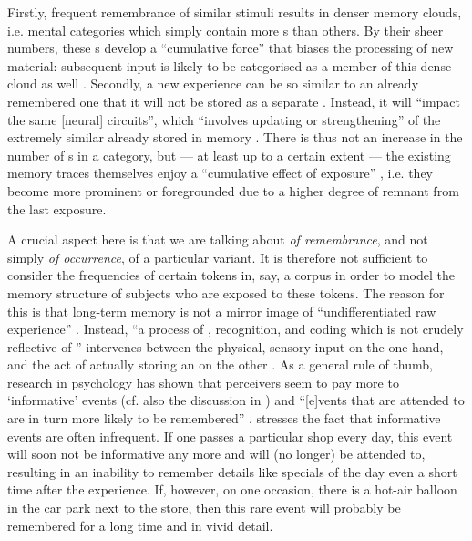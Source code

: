 Firstly, frequent remembrance of similar stimuli results in denser memory clouds, i.e. mental categories which simply contain more s than others.
By their sheer numbers, these s develop a ``cumulative force'' that biases the processing of new material: subsequent input is likely to be categorised as a member of this dense cloud as well \parencite[cf.][524]{pierrehumbert2006}.
Secondly, a new experience can be so similar to an already remembered one that it will not be stored as a separate .
Instead, it will ``impact the same [neural] circuits'', which ``involves updating or strengthening'' of the extremely similar  already stored in memory \parencite[525]{pierrehumbert2006}.
There is thus not an increase in the number of s in a category, but --- at least up to a certain extent --- the existing memory traces themselves enjoy a ``cumulative effect of exposure'' \parencite[525]{pierrehumbert2006}, i.e. they become more prominent or foregrounded due to a higher degree of remnant  from the last exposure.

A crucial aspect here is that we are talking about \emph{ of remembrance}, and not simply \emph{ of occurrence}, of a particular variant.
It is therefore not sufficient to consider the frequencies of certain tokens in, say, a corpus in order to model the memory structure of subjects who are exposed to these tokens.
The reason for this is that long-term memory is not a mirror image of ``undifferentiated raw experience'' \parencite[525]{pierrehumbert2006}.
Instead, ``a process of , recognition, and coding which is not crudely reflective of '' intervenes between the physical, sensory input on the one hand, and the act of actually storing an  on the other \parencite[525]{pierrehumbert2006}.
As a general rule of thumb, research in psychology has shown that perceivers seem to pay more  to `informative' events (cf. also the discussion in \citealt{racz2013}) and ``[e]vents that are attended to are in turn more likely to be remembered'' \parencite[525]{pierrehumbert2006}.
\textcite[cf.][525]{pierrehumbert2006} stresses the fact that informative events are often infrequent.
If one passes a particular shop every day, this event will soon not be informative any more and will (no longer) be attended to, resulting in an inability to remember details like specials of the day even a short time after the experience.
If, however, on one occasion, there is a hot-air balloon in the car park next to the store, then this rare event will probably be remembered for a long time and in vivid detail.

